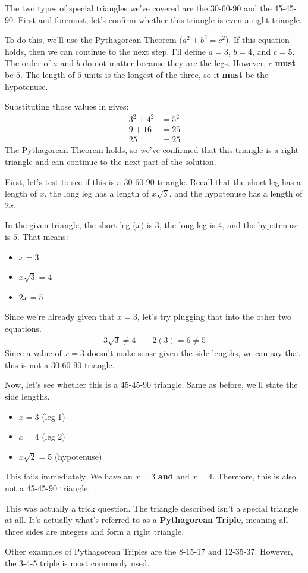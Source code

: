 \begin{solution}
    The two types of special triangles we've covered are the 30-60-90 and the 45-45-90. First and foremost, let's confirm whether this triangle is even a right triangle.

    To do this, we'll use the Pythagorean Theorem ($a^2 + b^2 = c^2$). If this equation holds, then we can continue to the next step.
    \clearpage
    I'll define $a = 3$, $b = 4$, and $c = 5$. The order of $a$ and $b$ do not matter because they are the legs. However, $c$ \textbf{must} be $5$. The length of $5$ units is the longest of the three, so it \textbf{must} be the hypotenuse.

    Substituting those values in gives:
    \begin{align*}
        3^2 + 4^2 &= 5^2 \\
        9 + 16 &= 25 \\
        25 &= 25
    \end{align*}
    The Pythagorean Theorem holds, so we've confirmed that this triangle is a right triangle and can continue to the next part of the solution.

    First, let's test to see if this is a 30-60-90 triangle. Recall that the short leg has a length of $x$, the long leg has a length of $x\sqrt{3}$, and the hypotenuse has a length of $2x$.

    In the given triangle, the short leg ($x$) is $3$, the long leg is $4$, and the hypotenuse is $5$. That means:
    \begin{itemize}
        \item $x = 3$
        \item $x\sqrt{3} = 4$
        \item $2x = 5$
    \end{itemize}
    Since we're already given that $x = 3$, let's try plugging that into the other two equations.
    \begin{align*}
        3\sqrt{3} \neq 4 \qquad 2(3) = 6 \neq 5
    \end{align*}
    Since a value of $x = 3$ doesn't make sense given the side lengths, we can say that this is not a 30-60-90 triangle.

    Now, let's see whether this is a 45-45-90 triangle. Same as before, we'll state the side lengths.
    \begin{itemize}
        \item $x = 3$ (leg 1)
        \item $x = 4$ (leg 2)
        \item $x\sqrt{2} = 5$ (hypotenuse)
    \end{itemize}
    This fails immediately. We have an $x = 3$ \textbf{and} and $x = 4$. Therefore, this is also not a 45-45-90 triangle.

    This was actually a trick question. The triangle described isn't a special triangle at all. It's actually what's referred to as a \textbf{Pythagorean Triple}, meaning all three sides are integers and form a right triangle.

    Other examples of Pythagorean Triples are the 8-15-17 and 12-35-37. However, the 3-4-5 triple is most commonly used.
\end{solution}